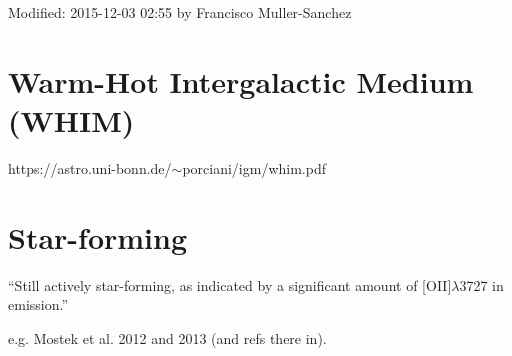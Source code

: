 \documentclass[11pt]{article}
\begin{document}
     Modified: 2015-12-03 02:55 by Francisco Muller-Sanchez



\section{Warm-Hot Intergalactic Medium (WHIM)}
https://astro.uni-bonn.de/$\sim$porciani/igm/whim.pdf


\section{Star-forming}
``Still actively star-forming, as indicated by a significant amount of [OII]$\lambda$3727 in emission.'' 

\noindent
e.g. Mostek et al. 2012 and 2013 (and refs there in). 
\end{document}
